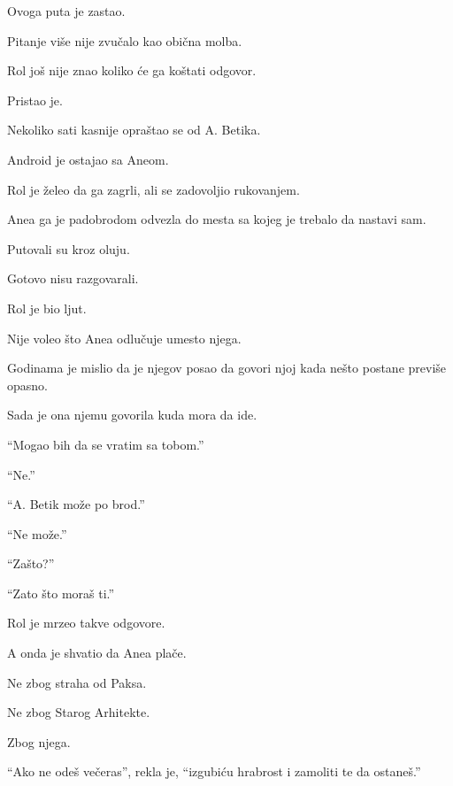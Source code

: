 Ovoga puta je zastao.

\bigskip

Pitanje više nije zvučalo kao obična molba.

\bigskip

Rol još nije znao koliko će ga koštati odgovor.

\bigskip

Pristao je.

\bigskip

Nekoliko sati kasnije opraštao se od A. Betika.

Android je ostajao sa Aneom.

Rol je želeo da ga zagrli, ali se zadovoljio rukovanjem.

\bigskip

Anea ga je padobrodom odvezla do mesta sa kojeg je trebalo da nastavi sam.

\bigskip

Putovali su kroz oluju.

Gotovo nisu razgovarali.

\bigskip

Rol je bio ljut.

Nije voleo što Anea odlučuje umesto njega.

Godinama je mislio da je njegov posao da govori njoj kada nešto postane previše opasno.

Sada je ona njemu govorila kuda mora da ide.

\bigskip

``Mogao bih da se vratim sa tobom.''

``Ne.''

``A. Betik može po brod.''

``Ne može.''

``Zašto?''

``Zato što moraš ti.''

\bigskip

Rol je mrzeo takve odgovore.

\bigskip

A onda je shvatio da Anea plače.

\bigskip

Ne zbog straha od Paksa.

Ne zbog Starog Arhitekte.

\bigskip

Zbog njega.

\bigskip

``Ako ne odeš večeras'', rekla je, ``izgubiću hrabrost i zamoliti te da ostaneš.''

